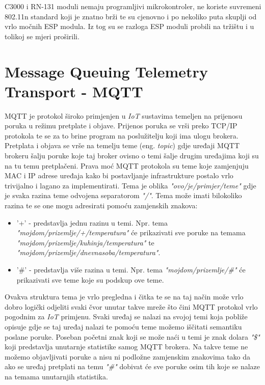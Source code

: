 \documentclass[times, utf8, zavrsni]{fer}
\begin{document}
C3000 i RN-131 moduli nemaju programljivi mikrokontroler, ne koriste suvremeni 802.11n standard koji je znatno brži te su cjenovno i po nekoliko puta skuplji od vrlo močnih ESP modula.
Iz tog su se razloga ESP moduli probili na tržištu i u tolikoj se mjeri proširili.

\section{Message Queuing Telemetry Transport - \textbf{MQTT}}
MQTT je protokol široko primjenjen u \textit{IoT} sustavima temeljen na prijenosu poruka u režimu pretplate i objave.
Prijenos poruka se vrši preko TCP/IP protokola te se za to brine program na poslužitelju koji ima ulogu brokera.
Pretplata i objava se vrše na temelju teme (eng. \textit{topic}) gdje uređaji MQTT brokeru šalju poruke koje taj broker ovisno o temi šalje drugim uređajima koji su na tu temu pretplačeni.
Prava moć MQTT protokola su teme koje zamjenjuju MAC i IP adrese uređaja kako bi postavljanje infrastrukture postalo vrlo trivijalno i lagano za implementirati.
Tema je oblika \textit{"ovo/je/primjer/teme"} gdje je svaka razina teme odvojena separatorom \textit{"/"}.
Tema može imati bilokoliko razina te se one mogu adresirati pomoću zamjenskih znakova:
\begin{itemize}
    \item '+' - predstavlja jednu razinu u temi. Npr. tema \textit{"mojdom/prizemlje/+/temperatura"} će prikazivati sve poruke na temama \textit{"mojdom/prizemlje/kuhinja/temperatura"} te \textit{"mojdom/prizemlje/dnevnasoba/temperatura"}.
    \item '\#' - predstavlja više razina u temi. Npr. tema \textit{"mojdom/prizemlje/\#"} će prikazivati sve teme koje su podskup ove teme.
\end{itemize}
Ovakva struktura tema je vrlo pregledna i čitka te se na taj način može vrlo dobro logički odjeliti svaki čvor unutar takve mreže što čini MQTT protokol vrlo pogodnim za \textit{IoT} primjenu.
Svaki uređaj se nalazi na svojoj temi koja pobliže opisuje gdje se taj uređaj nalazi te pomoću teme možemo iščitati semantiku poslane poruke.
Poseban početni znak koji se može naći u temi je znak dolara \textit{"\$"} koji predstavlja unutarnje statistike samog MQTT brokera.
Na takve teme ne možemo objavljivati poruke a nisu ni podložne zamjenskim znakovima tako da ako se uređaj pretplati na temu \textit{"\#"} dobivat će sve poruke osim tih koje se nalaze na temama unutarnjih statistika.
\end{document}
